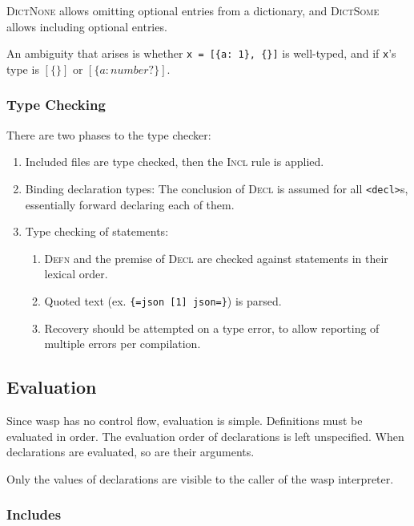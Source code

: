 \textsc{DictNone} allows omitting optional entries from a dictionary, and
\textsc{DictSome} allows including optional entries.

An ambiguity that arises is whether \texttt{x = [\{a: 1\}, \{\}]} is well-typed,
and if \texttt{x}'s type is $[\{\}]$ or $[\{ a: number? \}]$.

\subsubsection{Type Checking}

There are two phases to the type checker:

\begin{enumerate}
  \item Included files are type checked, then the \textsc{Incl}
        rule is applied.
  \item Binding declaration types: The conclusion of \textsc{Decl} is assumed
        for all \texttt{<decl>}s, essentially forward declaring each of them.
  \item Type checking of statements:
        \begin{enumerate}
          \item \textsc{Defn} and the premise of \textsc{Decl}
                are checked against statements in their lexical order.
          \item Quoted text (ex. \texttt{\{=json [1] json=\}}) is parsed.
          \item Recovery should be attempted on a type error, to allow reporting
                of multiple errors per compilation.
        \end{enumerate}
\end{enumerate}

\subsection{Evaluation}

Since wasp has no control flow, evaluation is simple. Definitions must be
evaluated in order. The evaluation order of declarations is left
unspecified. When declarations are evaluated, so are their arguments.

Only the values of declarations are visible to the caller of the wasp
interpreter.

\subsubsection{Includes}

